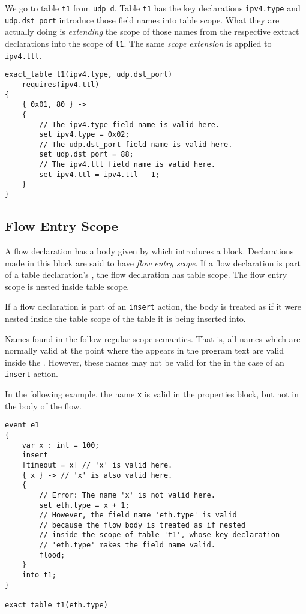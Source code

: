 We go to table \texttt{t1} from \texttt{udp\_d}. Table \texttt{t1} has the key declarations \texttt{ipv4.type} and \texttt{udp.dst\_port} introduce those field names into table scope. What they are actually doing is \textit{extending} the scope of those names from the respective extract declarations into the scope of \texttt{t1}. The same \textit{scope extension} is applied to \texttt{ipv4.ttl}.

\noindent\begin{minipage}{\linewidth}
\begin{lstlisting}
exact_table t1(ipv4.type, udp.dst_port)
	requires(ipv4.ttl)
{
	{ 0x01, 80 } ->
	{
		// The ipv4.type field name is valid here.
		set ipv4.type = 0x02;
		// The udp.dst_port field name is valid here.
		set udp.dst_port = 88;
		// The ipv4.ttl field name is valid here.
		set ipv4.ttl = ipv4.ttl - 1;
	}
}
\end{lstlisting}
\end{minipage}

\subsection{Flow Entry Scope} \label{flow_scope}

A flow declaration has a body given by  which introduces a block. Declarations made in this block are said to have \textit{flow entry scope}. If a flow declaration is part of a table declaration's , the flow declaration has table scope. The flow entry scope is nested inside table scope.

If a flow declaration is part of an \texttt{insert} action, the body is treated as if it were nested inside the table scope of the table it is being inserted into. 

Names found in the  follow regular scope semantics. That is, all names which are normally valid at the point where the  appears in the program text are valid inside the . However, these names may not be valid for the  in the case of an \texttt{insert} action.

In the following example, the name \texttt{x} is valid in the properties block, but not in the body of the flow.

\noindent\begin{minipage}{\linewidth}
\begin{lstlisting}
event e1 
{
	var x : int = 100;
	insert
	[timeout = x] // 'x' is valid here.
	{ x } -> // 'x' is also valid here. 
	{
		// Error: The name 'x' is not valid here.
		set eth.type = x + 1; 
		// However, the field name 'eth.type' is valid
		// because the flow body is treated as if nested
		// inside the scope of table 't1', whose key declaration
		// 'eth.type' makes the field name valid.
		flood; 
	}
	into t1;
}

exact_table t1(eth.type)
\end{lstlisting}
\end{minipage}

